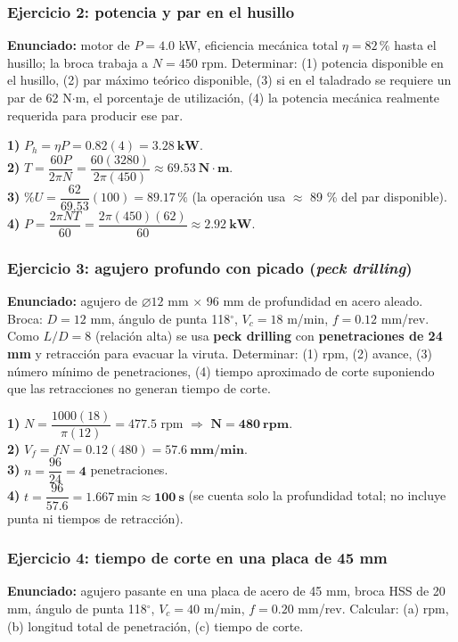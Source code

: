 \documentclass[12pt,a4paper]{article}
\begin{document}
\subsubsection*{Ejercicio 2: potencia y par en el husillo}
\textbf{Enunciado:} motor de $P = 4.0$ kW, eficiencia mecánica total $\eta =
	82\,\%$ hasta el husillo; la broca trabaja a $N = 450$ rpm. Determinar: (1)
potencia disponible en el husillo, (2) par máximo teórico disponible, (3) si en
el taladrado se requiere un par de 62 N$\cdot$m, el porcentaje de utilización,
(4) la potencia mecánica realmente requerida para producir ese par.

\textbf{1)} $P_h = \eta P = 0.82(4) = \mathbf{3.28\ kW}$.\\
\textbf{2)} $T = \dfrac{60 P}{2\pi N} = \dfrac{60(3280)}{2\pi(450)} \approx
	\mathbf{69.53\ N\cdot m}$.\\
\textbf{3)} $\%U = \dfrac{62}{69.53}(100) = \mathbf{89.17\,\%}$ (la operación
usa $\approx$ 89 \% del par disponible).\\
\textbf{4)} $P = \dfrac{2\pi N T}{60} = \dfrac{2\pi(450)(62)}{60} \approx
	\mathbf{2.92\ kW}$.

\subsubsection*{Ejercicio 3: agujero profundo con picado (\emph{peck drilling})}
\textbf{Enunciado:} agujero de $\varnothing 12$ mm $\times$ 96 mm de profundidad en acero aleado. Broca: $D = 12$ mm, ángulo de punta 118$^\circ$, $V_c = 18$ m/min, $f = 0.12$ mm/rev. Como $L/D = 8$ (relación alta) se usa \textbf{peck drilling} con \textbf{penetraciones de 24 mm} y retracción para evacuar la viruta. Determinar: (1) rpm, (2) avance, (3) número mínimo de penetraciones, (4) tiempo aproximado de corte suponiendo que las retracciones no generan tiempo de corte.

\textbf{1)} $N = \dfrac{1000(18)}{\pi(12)} = 477.5$ rpm $\Rightarrow$ $\mathbf{N
		= 480\ rpm}$.\\
\textbf{2)} $V_f = f N = 0.12(480) = \mathbf{57.6\ mm/min}$.\\
\textbf{3)} $n = \dfrac{96}{24} = \mathbf{4}$ penetraciones.\\
\textbf{4)} $t = \dfrac{96}{57.6} = 1.667\ \text{min} \approx \mathbf{100\ s}$
(se cuenta solo la profundidad total; no incluye punta ni tiempos de
retracción).

\subsubsection*{Ejercicio 4: tiempo de corte en una placa de 45 mm}
\textbf{Enunciado:} agujero pasante en una placa de acero de 45 mm, broca HSS de 20 mm, ángulo de punta 118$^\circ$, $V_c = 40$ m/min, $f = 0.20$ mm/rev. Calcular: (a) rpm, (b) longitud total de penetración, (c) tiempo de corte.
\end{document}
